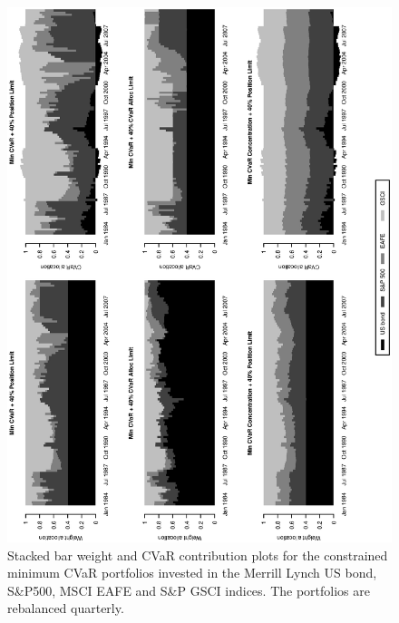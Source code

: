 \documentclass[11pt]{article}
\begin{document}
\newpage

\begin{figure}[tb]
\caption{Stacked bar weight and CVaR contribution plots for the constrained minimum CVaR portfolios invested in the Merrill Lynch US bond, S\&P500, MSCI EAFE and S\&P GSCI indices. The portfolios are rebalanced quarterly.}
\includegraphics[width=12cm,angle=270]{MinCVaR_alternatives.eps}
\end{figure}
\end{document}
